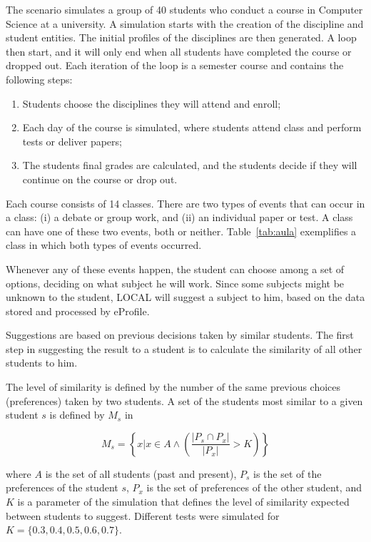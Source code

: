\documentclass[preprint,authoryear,12pt,dvipdfm]{elsarticle}
\begin{document}
The scenario simulates a group of 40 students who conduct a course in Computer Science at a university. A simulation starts with the creation of the discipline and student entities. The initial profiles of the disciplines are then generated. A loop then start, and it will only end when all students have completed the course or dropped out. Each iteration of the loop is a semester course and contains the following steps:

\begin{enumerate}
\item Students choose the disciplines they will attend and enroll;
\item Each day of the course is simulated, where students attend class and perform tests or deliver papers;
\item The students final grades are calculated, and the students decide if they will continue on the course or drop out.
\end{enumerate}

Each course consists of 14 classes. There are two types of events that can occur in a class: (i) a debate or group work, and (ii) an individual paper or test. A class can have one of these two events, both or neither. Table~\ref{tab:aula} exemplifies a class in which both types of events occurred.

Whenever any of these events happen, the student can choose among a set of options, deciding on what subject he will work. Since some subjects might be unknown to the student, LOCAL will suggest a subject to him, based on the data stored and processed by eProfile. 

Suggestions are based on previous decisions taken by similar students. The first step in suggesting the result to a student is to calculate the similarity of all other students to him.

The level of similarity is defined by the number of the same previous choices (preferences) taken by two students. A set of the students most similar to a given student $s$ is defined by $M_s$ in 

\[ M_s = \left\{ x | x \in A \wedge \left( \frac{\left|P_s\cap P_x\right|}{\left|P_x\right|} > K \right) \right\} \]

where $A$ is the set of all students (past and present), $P_s$ is the set of the preferences of the student $s$, $P_x$ is the set of preferences of the other student, and $K$ is a parameter of the simulation that defines the level of similarity expected between students to suggest. Different tests were simulated for $K = \{ 0.3, 0.4, 0.5, 0.6, 0.7 \}$.
\end{document}

